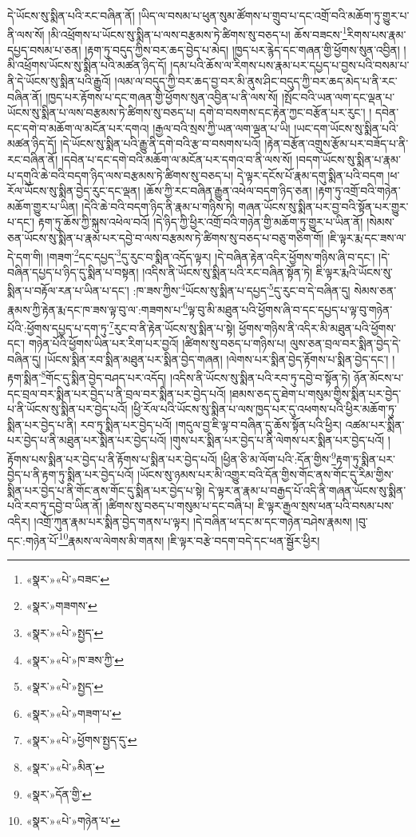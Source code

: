 དེ་ཡོངས་སུ་སྨིན་པའི་རང་བཞིན་ནོ། །ཡིད་ལ་བསམ་པ་ཕུན་སུམ་ཚོགས་པ་གྲུབ་པ་དང་འགྲོ་བའི་མཆོག་ཏུ་གྱུར་པ་ནི་ལས་སོ། །མི་འཕྲོགས་པ་ཡོངས་སུ་སྨིན་པ་ལས་བརྩམས་ཏེ་ཚིགས་སུ་བཅད་པ། ཆོས་བཟངས་\footnote{«སྣར་»«པེ་»བཟང་}རིགས་པས་རྣམ་དཔྱད་བསམ་པ་ཅན། །རྟག་ཏུ་བདུད་ཀྱིས་བར་ཆད་བྱེད་པ་མེད། །ཁྱད་པར་རྙེད་དང་གཞན་གྱི་ཕྱོགས་སུན་འབྱིན། །མི་འཕྲོགས་ཡོངས་སུ་སྨིན་པའི་མཚན་ཉིད་དོ། །དམ་པའི་ཆོས་ལ་རིགས་པས་རྣམ་པར་དཔྱད་པ་བྱས་པའི་བསམ་པ་ནི་དེ་ཡོངས་སུ་སྨིན་པའི་རྒྱུའོ། །ལམ་ལ་བདུད་ཀྱི་བར་ཆད་བྱ་བར་མི་ནུས་ཤིང་བདུད་ཀྱི་བར་ཆད་མེད་པ་ནི་རང་བཞིན་ནོ། །ཁྱད་པར་རྟོགས་པ་དང་གཞན་གྱི་ཕྱོགས་སུན་འབྱིན་པ་ནི་ལས་སོ། །སྤོང་བའི་ཡན་ལག་དང་ལྡན་པ་ཡོངས་སུ་སྨིན་པ་ལས་བརྩམས་ཏེ་ཚིགས་སུ་བཅད་པ། དགེ་བ་བསགས་དང་རྟེན་ཀྱང་བརྩོན་པར་རུང་། །
དབེན་དང་དགེ་བ་མཆོག་ལ་མངོན་པར་དགའ། །རྒྱལ་བའི་སྲས་ཀྱི་ཡན་ལག་ལྡན་པ་ཡི། །ཡང་དག་ཡོངས་སུ་སྨིན་པའི་མཚན་ཉིད་དོ། །དེ་ཡོངས་སུ་སྨིན་པའི་རྒྱུ་ནི་དགེ་བའི་རྩ་བ་བསགས་པའོ། །རྟེན་བརྩོན་འགྲུས་རྩོམ་པར་བཟོད་པ་ནི་རང་བཞིན་ནོ། །དབེན་པ་དང་དགེ་བའི་མཆོག་ལ་མངོན་པར་དགའ་བ་ནི་ལས་སོ། །བདག་ཡོངས་སུ་སྨིན་པ་རྣམ་པ་དགུའི་ཆེ་བའི་བདག་ཉིད་ལས་བརྩམས་ཏེ་ཚིགས་སུ་བཅད་པ། དེ་ལྟར་དངོས་པོ་རྣམ་དགུ་སྨིན་པའི་བདག །ཕ་རོལ་ཡོངས་སུ་སྨིན་བྱེད་རུང་དང་ལྡན། །ཆོས་ཀྱི་རང་བཞིན་རྒྱུན་འཕེལ་བདག་ཉིད་ཅན། །རྟག་ཏུ་འགྲོ་བའི་གཉེན་མཆོག་གྱུར་པ་ཡིན། །དེའི་ཆེ་བའི་བདག་ཉིད་ནི་རྣམ་པ་གཉིས་ཏེ། གཞན་ཡོངས་སུ་སྨིན་པར་བྱ་བའི་སྟོན་པར་གྱུར་པ་དང་། རྟག་ཏུ་ཆོས་ཀྱི་སྐུས་འཕེལ་བའོ། །དེ་ཉིད་ཀྱི་ཕྱིར་འགྲོ་བའི་གཉེན་གྱི་མཆོག་ཏུ་གྱུར་པ་ཡིན་ནོ། །སེམས་ཅན་ཡོངས་སུ་སྨིན་པ་རྣམ་པར་དབྱེ་བ་ལས་བརྩམས་ཏེ་ཚིགས་སུ་བཅད་པ་བཅུ་གཅིག་གོ། །ཇི་ལྟར་རྨ་དང་ཟས་ལ་དེ་དག་གི། །གཟག་\footnote{«སྣར་»གཟགས་}དང་དཔྱད་\footnote{«སྣར་»«པེ་»སྤྱད་}དུ་རུང་བ་སྨིན་འདོད་ལྟར། །དེ་བཞིན་རྟེན་འདིར་ཕྱོགས་གཉིས་ཞི་བ་དང་། །དེ་བཞིན་དཔྱད་པ་ཉིད་དུ་སྨིན་པ་བསྟན། །འདིས་ནི་ཡོངས་སུ་སྨིན་པའི་རང་བཞིན་སྟོན་ཏེ། ཇི་ལྟར་རྨའི་ཡོངས་སུ་སྨིན་པ་བརྟོལ་རན་པ་ཡིན་པ་དང་། :ཁ་ཟས་ཀྱིས་\footnote{«སྣར་»«པེ་»ཁ་ཟས་ཀྱི་}ཡོངས་སུ་སྨིན་པ་དཔྱད་\footnote{«སྣར་»«པེ་»སྤྱད་}དུ་རུང་བ་དེ་བཞིན་དུ། སེམས་ཅན་རྣམས་ཀྱི་རྟེན་རྨ་དང་ཁ་ཟས་ལྟ་བུ་ལ་:གཟགས་པ་\footnote{«སྣར་»«པེ་»གཟག་པ་}ལྟ་བུ་མི་མཐུན་པའི་ཕྱོགས་ཞི་བ་དང་དཔྱད་པ་ལྟ་བུ་གཉེན་པོའི་:ཕྱོགས་དཔྱད་པ་དག་ཏུ་\footnote{«སྣར་»«པེ་»ཕྱོགས་སྤྱད་དུ་}རུང་བ་ནི་རྟེན་ཡོངས་སུ་སྨིན་པ་སྟེ། ཕྱོགས་གཉིས་ནི་འདིར་མི་མཐུན་པའི་ཕྱོགས་དང་། གཉེན་པོའི་ཕྱོགས་ཡིན་པར་རིག་པར་བྱའོ། །ཚིགས་སུ་བཅད་པ་གཉིས་པ། ལུས་ཅན་བྲལ་བར་སྨིན་བྱེད་དེ་བཞིན་དུ། །ཡོངས་སྨིན་རབ་སྨིན་མཐུན་པར་སྨིན་བྱེད་གཞན། །ལེགས་པར་སྨིན་བྱེད་རྟོགས་པ་སྨིན་བྱེད་དང་། །རྟག་སྨིན་\footnote{«སྣར་»«པེ་»མིན་}གོང་དུ་སྨིན་བྱེད་བཤད་པར་འདོད། །འདིས་ནི་ཡོངས་སུ་སྨིན་པའི་རབ་ཏུ་དབྱེ་བ་སྟོན་ཏེ། ཉོན་མོངས་པ་དང་བྲལ་བར་སྨིན་པར་བྱེད་པ་ནི་བྲལ་བར་སྨིན་པར་བྱེད་པའོ། །ཐམས་ཅད་དུ་ཐེག་པ་གསུམ་གྱིས་སྨིན་པར་བྱེད་པ་ནི་ཡོངས་སུ་སྨིན་པར་བྱེད་པའོ། །ཕྱི་རོལ་པའི་ཡོངས་སུ་སྨིན་པ་ལས་ཁྱད་པར་དུ་འཕགས་པའི་ཕྱིར་མཆོག་ཏུ་སྨིན་པར་བྱེད་པ་ནི། རབ་ཏུ་སྨིན་པར་བྱེད་པའོ། །གདུལ་བྱ་ཇི་ལྟ་བ་བཞིན་དུ་ཆོས་སྟོན་པའི་ཕྱིར། འཚམ་པར་སྨིན་པར་བྱེད་པ་ནི་མཐུན་པར་སྨིན་པར་བྱེད་པའོ། །གུས་པར་སྨིན་པར་བྱེད་པ་ནི་ལེགས་པར་སྨིན་པར་བྱེད་པའོ། །རྟོགས་པས་སྨིན་པར་བྱེད་པ་ནི་རྟོགས་པ་སྨིན་པར་བྱེད་པའོ། །ཕྱིན་ཅི་མ་ལོག་པའི་:དོན་གྱིས་\footnote{«སྣར་»དོན་གྱི་}རྟག་ཏུ་སྨིན་པར་བྱེད་པ་ནི་རྟག་ཏུ་སྨིན་པར་བྱེད་པའོ། །ཡོངས་སུ་ཉམས་པར་མི་འགྱུར་བའི་དོན་གྱིས་གོང་ནས་གོང་དུ་རིམ་གྱིས་སྨིན་པར་བྱེད་པ་ནི་གོང་ནས་གོང་དུ་སྨིན་པར་བྱེད་པ་སྟེ། དེ་ལྟར་ན་རྣམ་པ་བརྒྱད་པོ་འདི་ནི་གཞན་ཡོངས་སུ་སྨིན་པའི་རབ་ཏུ་དབྱེ་བ་ཡིན་ནོ། །ཚིགས་སུ་བཅད་པ་གསུམ་པ་དང་བཞི་པ། ཇི་ལྟར་རྒྱལ་སྲས་ཕན་པའི་བསམ་པས་འདིར། །འགྲོ་ཀུན་རྣམ་པར་སྨིན་བྱེད་གནས་པ་ལྟར། །དེ་བཞིན་ཕ་དང་མ་དང་གཉེན་བཤེས་རྣམས། །བུ་དང་:གཉེན་པོ་\footnote{«སྣར་»«པེ་»གཉེན་པ་}རྣམས་ལ་ལེགས་མི་གནས། །ཇི་ལྟར་བརྩེ་བདག་བདེ་དང་ཕན་སྦྱོར་ཕྱིར། 